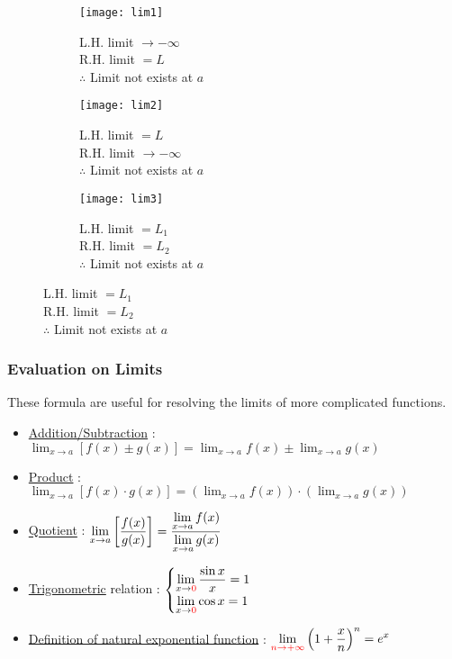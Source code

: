 \documentclass[class=article, crop=false, 12pt]{standalone}
\begin{document}
\begin{figure}
    \begin{subfigure}{0.33\textwidth}
        \centering
        \texttt{[image: lim1]}
        \caption{\centering  L.H. limit $\to -\infty$ \\ R.H. limit $=L$ \\$\therefore$ Limit not exists at $a$}
    \end{subfigure}
    \begin{subfigure}{0.33\textwidth}
        \centering
        \texttt{[image: lim2]}
        \caption{\centering  L.H. limit $=L$ \\ R.H. limit $\to -\infty$ \\ $\therefore$ Limit not exists at $a$}
    \end{subfigure}
    \begin{subfigure}{0.33\textwidth}
        \centering
        \texttt{[image: lim3]}
        \caption{\centering L.H. limit $=L_1$ \\ R.H. limit $=L_2$ \\ $\therefore$ Limit not exists at $a$}
    \end{subfigure}
\end{figure}

\subsubsection{Evaluation on Limits}

These formula are useful for resolving the limits of more complicated functions.

\begin{itemize}
    \item \ul{Addition/Subtraction} : $\displaystyle \lim_{x\to a} [f(x) \pm g(x)] = \lim_{x\to a}f(x) \pm \lim_{x\to a} g(x)$
    
    \item \ul{Product} : $\displaystyle \lim_{x\to a} [f(x) \cdot g(x)] = (\lim_{x\to a} f(x))\cdot (\lim_{x\to a} g(x))$
    
    \item \ul{Quotient} : $\displaystyle \lim_{x\to a} \qty[\frac{f(x)}{g(x)}] = \frac{\displaystyle\lim_{x\to a}f(x)}{\displaystyle\lim_{x\to a} g(x)}$ \quad {}
    
    \item \ul{Trigonometric} relation :
    $
        \begin{cases}
            \displaystyle \lim_{x\to {\color{red}{0}}} \frac{\sin{x}}{x} = 1 \\
            \displaystyle \lim_{x\to {\color{red}{0}}} \cos{x} = 1
        \end{cases}
    $
    
    \item \ul{Definition of natural exponential function} : $\displaystyle \lim_{\color{red}{n\to +\infty}} \qty(1+\frac{x}{n})^n = e^x$
\end{itemize}
\end{document}
